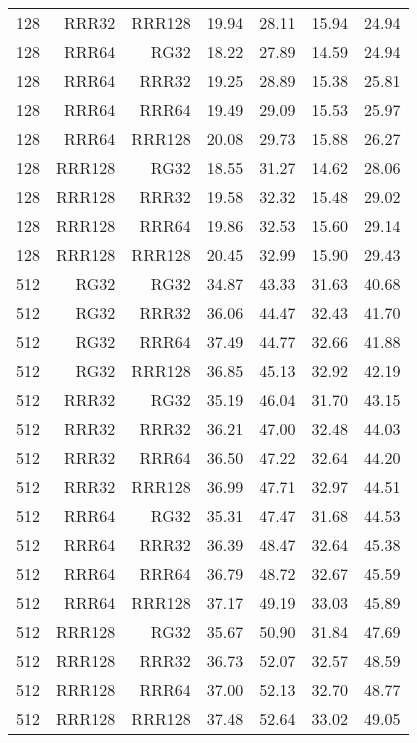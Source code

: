 \begin{table}
\begin{tabular}{|r|r|r|r|r|r|r|}
128 & RRR32 & RRR128 & 19.94 & 28.11 & 15.94 & 24.94 \\
128 & RRR64 & RG32 & 18.22 & 27.89 & 14.59 & 24.94 \\
128 & RRR64 & RRR32 & 19.25 & 28.89 & 15.38 & 25.81 \\
128 & RRR64 & RRR64 & 19.49 & 29.09 & 15.53 & 25.97 \\
128 & RRR64 & RRR128 & 20.08 & 29.73 & 15.88 & 26.27 \\
128 & RRR128 & RG32 & 18.55 & 31.27 & 14.62 & 28.06 \\
128 & RRR128 & RRR32 & 19.58 & 32.32 & 15.48 & 29.02 \\
128 & RRR128 & RRR64 & 19.86 & 32.53 & 15.60 & 29.14 \\
128 & RRR128 & RRR128 & 20.45 & 32.99 & 15.90 & 29.43 \\
512 & RG32 & RG32 & 34.87 & 43.33 & 31.63 & 40.68 \\
512 & RG32 & RRR32 & 36.06 & 44.47 & 32.43 & 41.70 \\
512 & RG32 & RRR64 & 37.49 & 44.77 & 32.66 & 41.88 \\
512 & RG32 & RRR128 & 36.85 & 45.13 & 32.92 & 42.19 \\
512 & RRR32 & RG32 & 35.19 & 46.04 & 31.70 & 43.15 \\
512 & RRR32 & RRR32 & 36.21 & 47.00 & 32.48 & 44.03 \\
512 & RRR32 & RRR64 & 36.50 & 47.22 & 32.64 & 44.20 \\
512 & RRR32 & RRR128 & 36.99 & 47.71 & 32.97 & 44.51 \\
512 & RRR64 & RG32 & 35.31 & 47.47 & 31.68 & 44.53 \\
512 & RRR64 & RRR32 & 36.39 & 48.47 & 32.64 & 45.38 \\
512 & RRR64 & RRR64 & 36.79 & 48.72 & 32.67 & 45.59 \\
512 & RRR64 & RRR128 & 37.17 & 49.19 & 33.03 & 45.89 \\
512 & RRR128 & RG32 & 35.67 & 50.90 & 31.84 & 47.69 \\
512 & RRR128 & RRR32 & 36.73 & 52.07 & 32.57 & 48.59 \\
512 & RRR128 & RRR64 & 37.00 & 52.13 & 32.70 & 48.77 \\
512 & RRR128 & RRR128 & 37.48 & 52.64 & 33.02 & 49.05 \\
\hline
\end{tabular}
\end{table}

